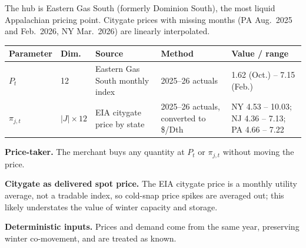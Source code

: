 \documentclass[11pt]{article}
\makeatletter
\newcommand{\subhead}[1]{\vspace{0.4em}\noindent{\bfseries\color{navy}#1}\par\vspace{0.1em}}
\newenvironment{ptable}
  {\par\smallskip\noindent\small
   \begin{tabular}{@{}p{1.9cm} p{1.2cm} p{3.6cm} p{4.5cm} p{3.7cm}@{}}
   \hline
   \textbf{Parameter} & \textbf{Dim.} & \textbf{Source} & \textbf{Method} & \textbf{Value / range} \\
   \hline}
  {\hline\end{tabular}\par\smallskip}
\makeatother
\begin{document}
\subhead{Prices}
The hub is Eastern Gas South (formerly Dominion South), the most liquid Appalachian pricing point.
Citygate prices with missing months (PA Aug.\ 2025 and Feb.\ 2026, NY Mar.\ 2026) are linearly
interpolated.
\begin{ptable}
$P_t$ & 12 & Eastern Gas South monthly index~\cite{platts} & 2025--26 actuals & 1.62 (Oct.) -- 7.15 (Feb.) \\
$\pi_{j,t}$ & $|J|\times 12$ & EIA citygate price by state~\cite{eia} & 2025--26 actuals, converted to \$/Dth & NY 4.53 -- 10.03; NJ 4.36 -- 7.13; PA 4.66 -- 7.22 \\
\end{ptable}
\vspace{-0.3\baselineskip}
\begin{assume}[resume=assumptions]
  \item \textbf{Price-taker.} The merchant buys any quantity at $P_t$ or $\pi_{j,t}$ without moving
        the price.
  \item \textbf{Citygate as delivered spot price.} The EIA citygate price is a monthly utility average,
        not a tradable index, so cold-snap price spikes are averaged out; this likely understates the
        value of winter capacity and storage.
  \item \textbf{Deterministic inputs.} Prices and demand come from the same year, preserving winter
        co-movement, and are treated as known.
\end{assume}
\end{document}
